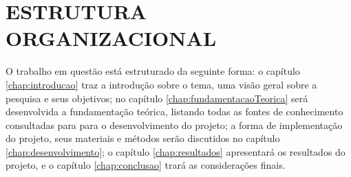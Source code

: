 \section{ESTRUTURA ORGANIZACIONAL}

O trabalho em questão está estruturado da seguinte forma: o capítulo \ref{chap:introducao} traz a introdução sobre o tema, uma visão geral sobre a pesquisa e seus objetivos; no capítulo \ref{chap:fundamentacaoTeorica} será desenvolvida a fundamentação teórica, listando todas as fontes de conhecimento consultadas para para o desenvolvimento do projeto; a forma de implementação do projeto, seus materiais e métodos serão discutidos no capítulo \ref{chap:desenvolvimento}; o capítulo \ref{chap:resultados} apresentará os resultados do projeto, e o capítulo \ref{chap:conclusao} trará as considerações finais.

